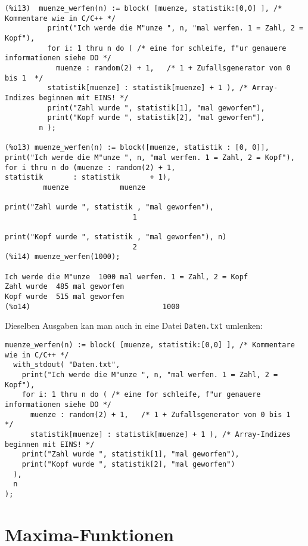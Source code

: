 \documentclass[ngerman,12pt,a4paper]{article}
\begin{document}
\scriptsize
\begin{verbatim}
(%i13)  muenze_werfen(n) := block( [muenze, statistik:[0,0] ], /* Kommentare wie in C/C++ */
          print("Ich werde die M"unze ", n, "mal werfen. 1 = Zahl, 2 = Kopf"),
          for i: 1 thru n do ( /* eine for schleife, f"ur genauere informationen siehe DO */
            muenze : random(2) + 1,   /* 1 + Zufallsgenerator von 0 bis 1  */
          statistik[muenze] : statistik[muenze] + 1 ), /* Array-Indizes beginnen mit EINS! */
          print("Zahl wurde ", statistik[1], "mal geworfen"),
          print("Kopf wurde ", statistik[2], "mal geworfen"),
        n );

(%o13) muenze_werfen(n) := block([muenze, statistik : [0, 0]], 
print("Ich werde die M"unze ", n, "mal werfen. 1 = Zahl, 2 = Kopf"), 
for i thru n do (muenze : random(2) + 1, 
statistik       : statistik       + 1), 
         muenze            muenze

print("Zahl wurde ", statistik , "mal geworfen"), 
                              1

print("Kopf wurde ", statistik , "mal geworfen"), n)
                              2
(%i14) muenze_werfen(1000);

Ich werde die M"unze  1000 mal werfen. 1 = Zahl, 2 = Kopf 
Zahl wurde  485 mal geworfen 
Kopf wurde  515 mal geworfen 
(%o14)                               1000
\end{verbatim}
\normalsize

Dieselben Ausgaben kan man auch in eine Datei \verb|Daten.txt| umlenken:

\scriptsize
\begin{verbatim}
muenze_werfen(n) := block( [muenze, statistik:[0,0] ], /* Kommentare wie in C/C++ */
  with_stdout( "Daten.txt", 
    print("Ich werde die M"unze ", n, "mal werfen. 1 = Zahl, 2 = Kopf"),
    for i: 1 thru n do ( /* eine for schleife, f"ur genauere informationen siehe DO */
      muenze : random(2) + 1,   /* 1 + Zufallsgenerator von 0 bis 1  */
      statistik[muenze] : statistik[muenze] + 1 ), /* Array-Indizes beginnen mit EINS! */
    print("Zahl wurde ", statistik[1], "mal geworfen"),
    print("Kopf wurde ", statistik[2], "mal geworfen")
  ),
  n 
);
\end{verbatim}
\normalsize

\section{Maxima-Funktionen}
\end{document}
